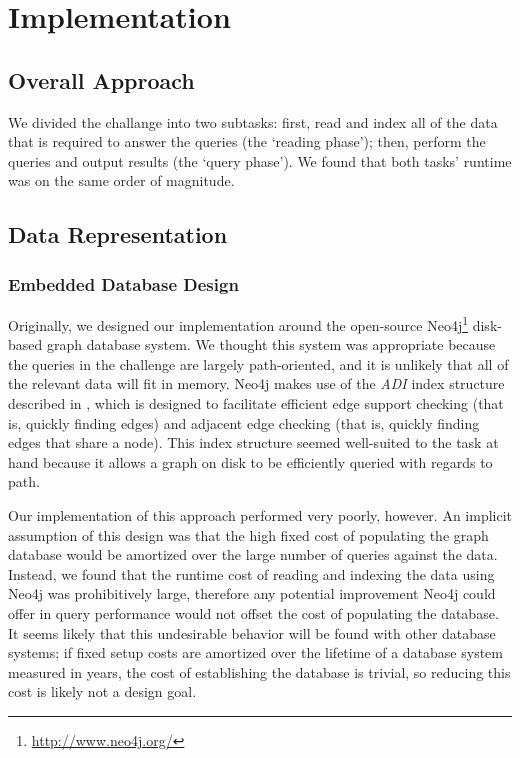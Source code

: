 \documentclass{article}
\begin{document}

\section{Implementation}
\subsection{Overall Approach}
We divided the challange into two subtasks: first, read and index all
of the data that is required to answer the queries (the `reading
phase'); then, perform the queries and output results (the `query
phase').  We found that both tasks' runtime was on the same order of
magnitude.  

\subsection{Data Representation}
\subsubsection{Embedded Database Design}
Originally, we designed our implementation around the open-source
Neo4j\footnote{\url{http://www.neo4j.org/}} disk-based graph database
system.  We thought this system was appropriate because the queries in
the challenge are largely path-oriented, and it is unlikely that all
of the relevant data will fit in memory.  Neo4j makes use of the
\emph{ADI} index structure \cite[Chapter~6]{IanRobinson:2013ul}
described in \cite{wang2004scalable}, which is designed to facilitate
efficient edge support checking (that is, quickly finding edges) and
adjacent edge checking (that is, quickly finding edges that share a
node).  This index structure seemed well-suited to the task at hand
because it allows a graph on disk to be efficiently queried with
regards to path.

Our implementation of this approach performed very poorly, however.
An implicit assumption of this design was that the high fixed cost of
populating the graph database would be amortized over the large number
of queries against the data.  Instead, we found that the runtime cost 
of reading and indexing the data using Neo4j was prohibitively large,
therefore any potential improvement Neo4j could offer in query performance
would not offset the cost of populating the database.
It seems likely that this undesirable behavior will be found
with other database systems; if fixed setup costs are amortized over
the lifetime of a database system measured in years, the cost of
establishing the database is trivial, so reducing this cost is likely
not a design goal.
\end{document}
